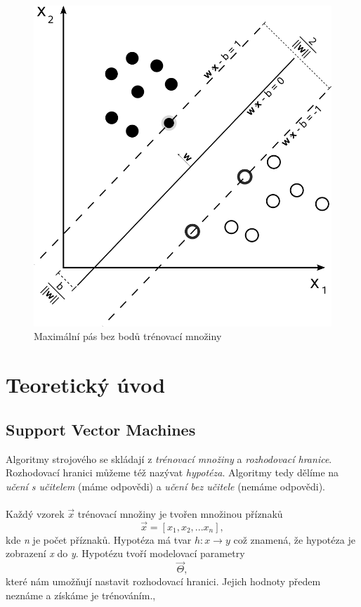 \documentclass[a4]{article}
\begin{document}
\begin{figure}[!ht]
	\centering
		\includegraphics[scale=0.25]{images/svm_vectors}
	\caption{Maximální pás bez bodů trénovací množiny \cite{svm_wiki}}
	\label{fig:svm_vectors}
\end{figure}

\section{Teoretický úvod}

\subsection{Support Vector Machines}
Algoritmy strojového se skládají z \textit{trénovací množiny} a \textit{rozhodovací hranice}. Rozhodovací hranici můžeme též nazývat \textit{hypotéza}. Algoritmy tedy dělíme na \textit{učení s učitelem} (máme odpovědi) a \textit{učení bez učitele} (nemáme odpovědi).
\\\\
Každý vzorek $\vec{x}$ trénovací množiny je tvořen množinou příznaků $$\vec{x} = [x_1,x_2,...x_n],$$kde \textit{n} je počet příznaků. Hypotéza má tvar $h:x \rightarrow y$ což znamená, že hypotéza je zobrazení \textit{x} do \textit{y}. Hypotézu tvoří modelovací parametry $$\vec{\Theta},$$které nám umožňují nastavit rozhodovací hranici. Jejich hodnoty předem neznáme a získáme je trénováním.\cite{andrew},\cite{svm_zcu}
\end{document}
